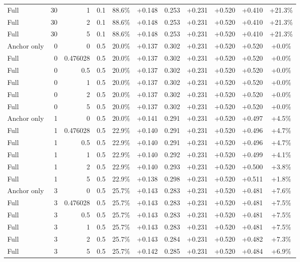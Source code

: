 \begin{table}[htbp]
\begin{tabular}{lrrrccccccc}
Full & 30 & 1 & 0.1 & 88.6\% & +0.148 & 0.253 & +0.231 & +0.520 & +0.410 & +21.3\% \\
Full & 30 & 2 & 0.1 & 88.6\% & +0.148 & 0.253 & +0.231 & +0.520 & +0.410 & +21.3\% \\
Full & 30 & 5 & 0.1 & 88.6\% & +0.148 & 0.253 & +0.231 & +0.520 & +0.410 & +21.3\% \\
Anchor only & 0 & 0 & 0.5 & 20.0\% & +0.137 & 0.302 & +0.231 & +0.520 & +0.520 & +0.0\% \\
Full & 0 & 0.476028 & 0.5 & 20.0\% & +0.137 & 0.302 & +0.231 & +0.520 & +0.520 & +0.0\% \\
Full & 0 & 0.5 & 0.5 & 20.0\% & +0.137 & 0.302 & +0.231 & +0.520 & +0.520 & +0.0\% \\
Full & 0 & 1 & 0.5 & 20.0\% & +0.137 & 0.302 & +0.231 & +0.520 & +0.520 & +0.0\% \\
Full & 0 & 2 & 0.5 & 20.0\% & +0.137 & 0.302 & +0.231 & +0.520 & +0.520 & +0.0\% \\
Full & 0 & 5 & 0.5 & 20.0\% & +0.137 & 0.302 & +0.231 & +0.520 & +0.520 & +0.0\% \\
Anchor only & 1 & 0 & 0.5 & 20.0\% & +0.141 & 0.291 & +0.231 & +0.520 & +0.497 & +4.5\% \\
Full & 1 & 0.476028 & 0.5 & 22.9\% & +0.140 & 0.291 & +0.231 & +0.520 & +0.496 & +4.7\% \\
Full & 1 & 0.5 & 0.5 & 22.9\% & +0.140 & 0.291 & +0.231 & +0.520 & +0.496 & +4.7\% \\
Full & 1 & 1 & 0.5 & 22.9\% & +0.140 & 0.292 & +0.231 & +0.520 & +0.499 & +4.1\% \\
Full & 1 & 2 & 0.5 & 22.9\% & +0.140 & 0.293 & +0.231 & +0.520 & +0.500 & +3.8\% \\
Full & 1 & 5 & 0.5 & 22.9\% & +0.138 & 0.298 & +0.231 & +0.520 & +0.511 & +1.8\% \\
Anchor only & 3 & 0 & 0.5 & 25.7\% & +0.143 & 0.283 & +0.231 & +0.520 & +0.481 & +7.6\% \\
Full & 3 & 0.476028 & 0.5 & 25.7\% & +0.143 & 0.283 & +0.231 & +0.520 & +0.481 & +7.5\% \\
Full & 3 & 0.5 & 0.5 & 25.7\% & +0.143 & 0.283 & +0.231 & +0.520 & +0.481 & +7.5\% \\
Full & 3 & 1 & 0.5 & 25.7\% & +0.143 & 0.283 & +0.231 & +0.520 & +0.481 & +7.5\% \\
Full & 3 & 2 & 0.5 & 25.7\% & +0.143 & 0.284 & +0.231 & +0.520 & +0.482 & +7.3\% \\
Full & 3 & 5 & 0.5 & 25.7\% & +0.142 & 0.285 & +0.231 & +0.520 & +0.484 & +6.9\% \\

\end{tabular}
\end{table}
